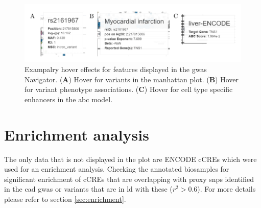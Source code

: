     \begin{figure}[h!]
    \capstart
        \centering
        \includegraphics{Abbildung/GWAS_navigator_hover.pdf}

        \begin{minipage}{\captionwidth}
            \caption[database]{\newline
            Exampalry hover effects for features displayed in the \ac{gwas} Navigator. (\textbf{A}) Hover for variants in the manhattan plot. (\textbf{B}) Hover for variant phenotype associations. (\textbf{C}) Hover for cell type specific enhancers in the \ac{abc} model.}
            \label{fig:GWAS_navigator_hover}
        \end{minipage}
    \end{figure}

\section{Enrichment analysis}
\label{sec:result_enrichment}
The only data that is not displayed in the plot are ENCODE \acp{cCRE} which were used for an enrichment analysis. Checking the annotated biosamples for significant enrichment of \acp{cCRE} that are overlapping with proxy \acp{snp} identified in the \ac{cad} \ac{gwas} or variants that are in \ac{ld} with these ($r^2 > 0.6$). For more details please refer to section \ref{sec:enrichment}.

